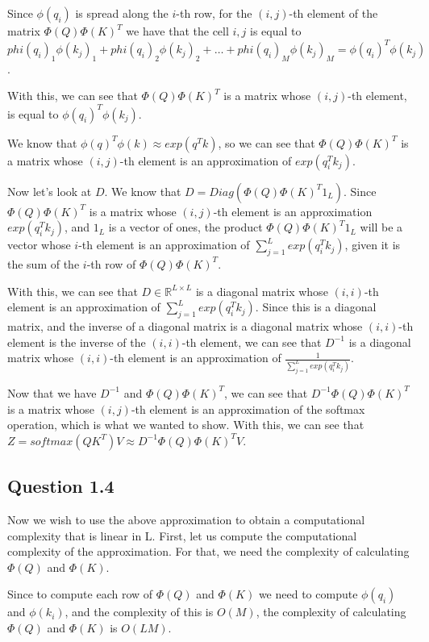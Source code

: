 \documentclass{article}
\begin{document}
\medskip

Since $\phi(q_i)$ is spread along the $i$-th row, for the $(i,j)$-th element of the matrix $\Phi(Q) \Phi(K)^T$ we have that the cell $i,j$ is equal to $
phi(q_i)_1 \phi(k_j)_1 + phi(q_i)_2 \phi(k_j)_2 + \dots + phi(q_i)_M \phi(k_j)_M = \phi(q_i)^T \phi(k_j)$.

With this, we can see that $\Phi(Q) \Phi(K)^T$ is a matrix whose $(i,j)$-th element, is equal to $\phi(q_i)^T \phi(k_j)$.

We know that $\phi(q)^T\phi(k) \approx exp(q^Tk)$, so we can see that $\Phi(Q) \Phi(K)^T$ is a matrix whose $(i,j)$-th element is an 
approximation of $exp(q_i^Tk_j)$.

\bigskip

Now let's look at $D$. We know that $D = Diag(\Phi(Q) \Phi(K)^T 1_L)$. Since $\Phi(Q) \Phi(K)^T$ is a matrix whose $(i,j)$-th element is an
approximation $exp(q_i^Tk_j)$, and $1_L$ is a vector of ones, the product $\Phi(Q) \Phi(K)^T 1_L$ will be a vector whose $i$-th element
is an approximation of $\sum_{j=1}^L exp(q_i^Tk_j)$, given it is the sum of the $i$-th row of $\Phi(Q) \Phi(K)^T$.

With this, we can see that $D \in \mathbb{R}^{L\times L}$ is a diagonal matrix whose $(i, i)$-th element is an approximation of $\sum_{j=1}^L exp(q_i^Tk_j)$.
Since this is a diagonal matrix, and the inverse of a diagonal matrix is a diagonal matrix whose $(i, i)$-th element is the inverse of the $(i, i)$-th element,
we can see that $D^{-1}$ is a diagonal matrix whose $(i, i)$-th element is an approximation of $\frac{1}{\sum_{j=1}^L exp(q_i^Tk_j)}$.

\bigskip

Now that we have $D^{-1}$ and $\Phi(Q) \Phi(K)^T$, we can see that $D^{-1}\Phi(Q) \Phi(K)^T$ is a matrix whose $(i,j)$-th element is an approximation of
the softmax operation, which is what we wanted to show. With this, we can see that $Z = softmax(QK^T)V \approx D^{-1}\Phi(Q) \Phi(K)^T V$.

\subsection{Question 1.4}

Now we wish to use the above approximation to obtain a computational complexity that is linear in L. First, let us compute the computational complexity of the
approximation. For that, we need the complexity of calculating $\Phi(Q)$ and $\Phi(K)$.

Since to compute each row of $\Phi(Q)$ and $\Phi(K)$ we need to compute $\phi(q_i)$ and $\phi(k_i)$, and the complexity of this is $O(M)$, 
the complexity of calculating $\Phi(Q)$ and $\Phi(K)$ is $O(L M)$.
\end{document}
